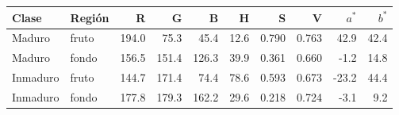 \footnotesize
\begin{tabular}{llrrrrrrrr}
\toprule
Clase & Región & R & G & B & H & S & V & $a^*$ & $b^*$ \\
\midrule
Maduro & fruto & 194.0 & 75.3 & 45.4 & 12.6 & 0.790 & 0.763 & 42.9 & 42.4 \\
Maduro & fondo & 156.5 & 151.4 & 126.3 & 39.9 & 0.361 & 0.660 & -1.2 & 14.8 \\
Inmaduro & fruto & 144.7 & 171.4 & 74.4 & 78.6 & 0.593 & 0.673 & -23.2 & 44.4 \\
Inmaduro & fondo & 177.8 & 179.3 & 162.2 & 29.6 & 0.218 & 0.724 & -3.1 & 9.2 \\
\bottomrule
\end{tabular}
